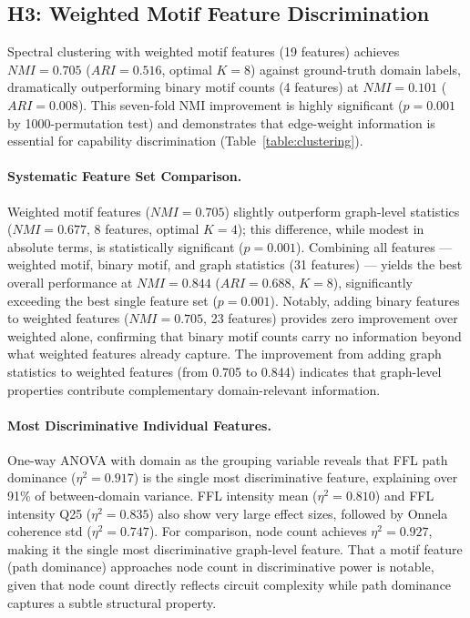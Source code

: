 \subsection{H3: Weighted Motif Feature Discrimination}\label{sec:results_h3}

Spectral clustering with weighted motif features (19 features) achieves $NMI=0.705$ ($ARI=0.516$, optimal $K=8$) against ground-truth domain labels, dramatically outperforming binary motif counts (4 features) at $NMI=0.101$ ($ARI=0.008$). This seven-fold NMI improvement is highly significant ($p=0.001$ by 1000-permutation test) and demonstrates that edge-weight information is essential for capability discrimination (Table~\ref{table:clustering}).

\paragraph{Systematic Feature Set Comparison.}
Weighted motif features ($NMI=0.705$) slightly outperform graph-level statistics ($NMI=0.677$, 8 features, optimal $K=4$); this difference, while modest in absolute terms, is statistically significant ($p=0.001$). Combining all features --- weighted motif, binary motif, and graph statistics (31 features) --- yields the best overall performance at $NMI=0.844$ ($ARI=0.688$, $K=8$), significantly exceeding the best single feature set ($p=0.001$). Notably, adding binary features to weighted features ($NMI=0.705$, 23 features) provides zero improvement over weighted alone, confirming that binary motif counts carry no information beyond what weighted features already capture. The improvement from adding graph statistics to weighted features (from 0.705 to 0.844) indicates that graph-level properties contribute complementary domain-relevant information.

\paragraph{Most Discriminative Individual Features.}
One-way ANOVA with domain as the grouping variable reveals that FFL path dominance ($\eta^2=0.917$) is the single most discriminative feature, explaining over 91\% of between-domain variance. FFL intensity mean ($\eta^2=0.810$) and FFL intensity Q25 ($\eta^2=0.835$) also show very large effect sizes, followed by Onnela coherence std ($\eta^2=0.747$). For comparison, node count achieves $\eta^2=0.927$, making it the single most discriminative graph-level feature. That a motif feature (path dominance) approaches node count in discriminative power is notable, given that node count directly reflects circuit complexity while path dominance captures a subtle structural property.

